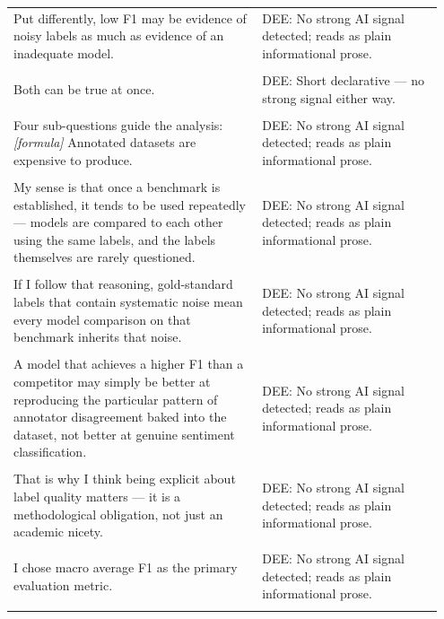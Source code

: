 \documentclass[11pt]{article}
\begin{document}
\begin{longtable}{|p{0.55\linewidth}|p{0.40\linewidth}|}
\hline
\rule{0pt}{3.5cm} & \\
\hline
Put differently, low F1 may be evidence of noisy labels as much as evidence of an inadequate model. & DEE: No strong AI signal detected; reads as plain informational prose. \\[2pt]
\hline
\rule{0pt}{3.5cm} & \\
\hline
Both can be true at once. & DEE: Short declarative --- no strong signal either way. \\[2pt]
\hline
\rule{0pt}{3.5cm} & \\
\hline
Four sub-questions guide the analysis: \textit{[formula]} Annotated datasets are expensive to produce. & DEE: No strong AI signal detected; reads as plain informational prose. \\[2pt]
\hline
\rule{0pt}{3.5cm} & \\
\hline
My sense is that once a benchmark is established, it tends to be used repeatedly --- models are compared to each other using the same labels, and the labels themselves are rarely questioned. & DEE: No strong AI signal detected; reads as plain informational prose. \\[2pt]
\hline
\rule{0pt}{3.5cm} & \\
\hline
If I follow that reasoning, gold-standard labels that contain systematic noise mean every model comparison on that benchmark inherits that noise. & DEE: No strong AI signal detected; reads as plain informational prose. \\[2pt]
\hline
\rule{0pt}{3.5cm} & \\
\hline
A model that achieves a higher F1 than a competitor may simply be better at reproducing the particular pattern of annotator disagreement baked into the dataset, not better at genuine sentiment classification. & DEE: No strong AI signal detected; reads as plain informational prose. \\[2pt]
\hline
\rule{0pt}{3.5cm} & \\
\hline
That is why I think being explicit about label quality matters --- it is a methodological obligation, not just an academic nicety. & DEE: No strong AI signal detected; reads as plain informational prose. \\[2pt]
\hline
\rule{0pt}{3.5cm} & \\
\hline
I chose macro average F1 as the primary evaluation metric. & DEE: No strong AI signal detected; reads as plain informational prose. \\[2pt]
\hline
\rule{0pt}{3.5cm} & \\

\end{longtable}
\end{document}
